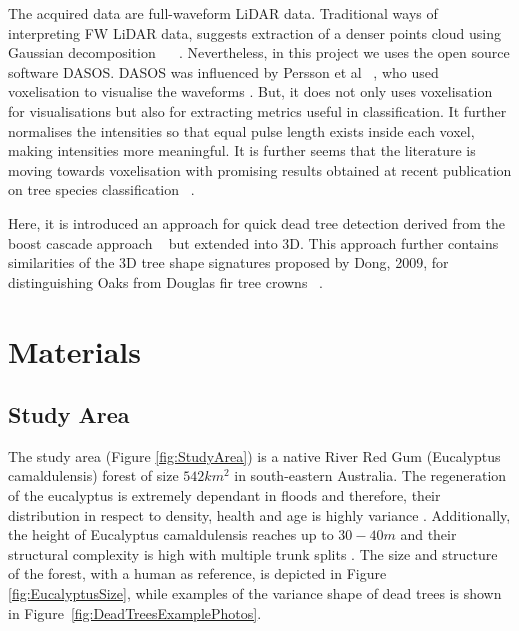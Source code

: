 \documentclass{subfiles}
\begin{document}
\par The acquired data are full-waveform LiDAR data. Traditional ways of interpreting FW LiDAR data, suggests extraction of a denser points cloud using Gaussian decomposition ~\cite{Neuenschwander2009} ~\cite{Reitberger2008}. Nevertheless, in this project we uses the open source software DASOS. DASOS was influenced by Persson et al ~\cite{Persson2005}, who used voxelisation to visualise the waveforms . But, it does not only uses voxelisation for visualisations but also for extracting metrics useful in classification. It further normalises the intensities so that equal pulse length exists inside each voxel, making intensities more meaningful. It is further seems that the literature is moving towards voxelisation with promising results obtained at recent publication on tree species classification ~\cite{Cao2016}. 

Here, it is introduced an approach for quick dead tree detection derived from the boost cascade approach ~\cite{Viola2001} but extended into 3D. This approach further contains similarities of the 3D tree shape signatures proposed by Dong, 2009, for distinguishing Oaks from Douglas fir tree crowns ~\cite{Dong2009}. 












\section{Materials}

\subsection{Study Area} \label{sec:StudyArea}

The study area (Figure \ref{fig:StudyArea}) is a native River Red Gum (Eucalyptus camaldulensis) forest  of size $542km^2$ in south-eastern Australia. The regeneration of the eucalyptus is extremely dependant in floods and therefore, their distribution in respect to density, health and age is highly variance \cite{Kerle2005}. Additionally, the height of Eucalyptus camaldulensis reaches up to $30-40m$ and their structural complexity is high with multiple trunk splits \cite{Wilson1995}. The size and structure of the forest, with a human as reference, is depicted in Figure \ref{fig:EucalyptusSize}, while examples of the variance shape of dead trees is shown in Figure~\ref{fig:DeadTreesExamplePhotos}. 
\end{document}
